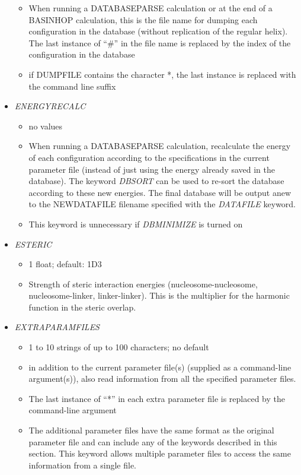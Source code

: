 \documentclass[12pt,dvips]{article}
\begin{document}
\begin{itemize}
\begin{itemize}
    \item When running a DATABASEPARSE calculation or at the end of a BASINHOP calculation, this is the file name for dumping each configuration in the database (without replication of the regular helix). The last instance of ``\#'' in the file name is replaced by the index of the configuration in the database
    \item if DUMPFILE contains the character *, the last instance is replaced with the command line suffix    
  \end{itemize}
%
\item {\it ENERGYRECALC}  
  \begin{itemize}
  \item no values
  \item When running a DATABASEPARSE calculation, recalculate the energy of each configuration according to the specifications in the current parameter file (instead of just using the energy already saved in the database). The keyword {\em DBSORT} can be used to re-sort the database according to these new energies. The final database will be output anew to the NEWDATAFILE filename specified with the {\em DATAFILE} keyword.
  \item This keyword is unnecessary if {\em DBMINIMIZE} is turned on
  \end{itemize}
% 
\item {\it ESTERIC}  
  \begin{itemize}
  \item 1 float; default: 1D3
  \item Strength of steric interaction energies (nucleosome-nucleosome, nucleosome-linker, linker-linker). This is the multiplier for the harmonic function in the steric overlap.
  \end{itemize}
%
\item {\it EXTRAPARAMFILES}
  \begin{itemize}
  \item 1 to 10 strings of up to 100 characters; no default
  \item in addition to the current parameter file(s) (supplied as a command-line argument(s)), also read information from all the specified parameter files.
  \item The last instance of ``*'' in each extra parameter file is replaced by the command-line argument
  \item The additional parameter files have the same format as the original parameter file and can include any of the keywords described in this section. This keyword allows multiple parameter files to access the same information from a single file.

\end{itemize}
\end{itemize}
\end{document}
